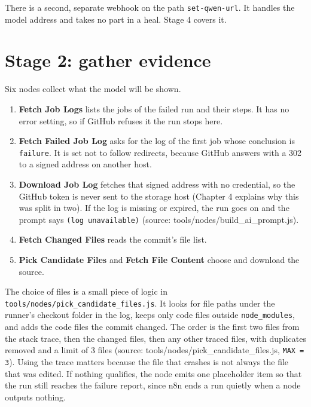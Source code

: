 There is a second, separate webhook on the path \texttt{set-\allowbreak{}qwen-\allowbreak{}url}. It handles the model address and takes no part in a heal. Stage 4 covers it.

\section{Stage 2: gather evidence}

Six nodes collect what the model will be shown.

\begin{enumerate}[leftmargin=*, itemsep=2pt]
\item \textbf{Fetch Job Logs} lists the jobs of the failed run and their steps. It has no error setting, so if GitHub refuses it the run stops here.
\item \textbf{Fetch Failed Job Log} asks for the log of the first job whose conclusion is \texttt{failure}. It is set not to follow redirects, because GitHub answers with a 302 to a signed address on another host.
\item \textbf{Download Job Log} fetches that signed address with no credential, so the GitHub token is never sent to the storage host (Chapter 4 explains why this was split in two). If the log is missing or expired, the run goes on and the prompt says \texttt{(log unavailable)} (source: tools/\allowbreak{}nodes/\allowbreak{}build\_\allowbreak{}ai\_\allowbreak{}prompt.js).
\item \textbf{Fetch Changed Files} reads the commit's file list.
\item \textbf{Pick Candidate Files} and \textbf{Fetch File Content} choose and download the source.
\end{enumerate}

The choice of files is a small piece of logic in \texttt{tools/\allowbreak{}nodes/\allowbreak{}pick\_\allowbreak{}candidate\_\allowbreak{}files.\allowbreak{}js}. It looks for file paths under the runner's checkout folder in the log, keeps only code files outside \texttt{node\_\allowbreak{}modules}, and adds the code files the commit changed. The order is the first two files from the stack trace, then the changed files, then any other traced files, with duplicates removed and a limit of 3 files (source: tools/\allowbreak{}nodes/\allowbreak{}pick\_\allowbreak{}candidate\_\allowbreak{}files.js, \texttt{MAX = 3}). Using the trace matters because the file that crashes is not always the file that was edited. If nothing qualifies, the node emits one placeholder item so that the run still reaches the failure report, since n8n ends a run quietly when a node outputs nothing.

